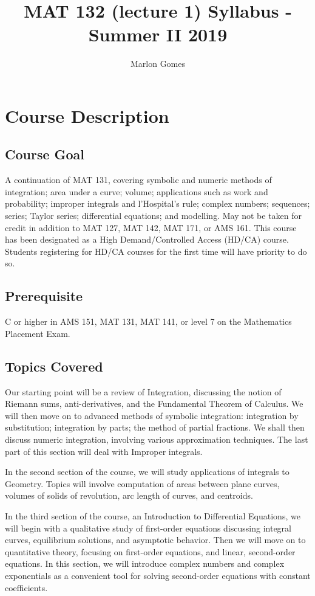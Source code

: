 \documentclass[11pt]{amsart}
\title[MAT 132 (lecture 1) Syllabus - Summer II 2019]{MAT 132 (lecture 1) Syllabus - Summer II 2019}
\author[M. Gomes]{Marlon Gomes}
\numberwithin{equation}{section}
\begin{document}
\maketitle

\section{Course Description}
\subsection{Course Goal}
A continuation of MAT 131, covering symbolic and numeric methods of integration; area under a curve; volume; applications such as work and probability; improper integrals and l'Hospital's rule; complex numbers; sequences; series; Taylor series; differential equations; and modelling. May not be taken for credit in addition to MAT 127, MAT 142, MAT 171, or AMS 161. This course has been designated as a High Demand/Controlled Access (HD/CA) course. Students registering for HD/CA courses for the first time will have priority to do so.
\subsection{Prerequisite}
C or higher in AMS 151, MAT 131, MAT 141, or level 7 on the Mathematics Placement Exam.

\subsection{Topics Covered}
Our starting point will be a review of Integration, discussing the notion of Riemann sums, anti-derivatives, and the Fundamental Theorem of Calculus. We will then move on to advanced methods of symbolic integration: integration by substitution; integration by parts; the method of partial fractions. We shall then discuss numeric integration, involving various approximation techniques. The last part of this section
will deal with Improper integrals.

In the second section of the course, we will study applications of integrals to Geometry. Topics will involve computation of areas between plane curves, volumes of solids of revolution, arc length of curves, and centroids. 

In the third section of the course, an Introduction to Differential Equations, we will begin with a qualitative study of first-order equations discussing integral curves, equilibrium solutions, and asymptotic behavior. Then we will move on to quantitative theory, focusing on first-order equations, and linear, second-order equations. In this section, we will introduce complex numbers and complex exponentials as a convenient tool for solving second-order equations with constant coefficients.
\end{document}
